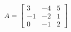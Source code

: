 \documentclass[preview]{standalone}
\begin{document}
\begin{align*}
A = \begin{bmatrix} 3 & -4 & 5 \\ -1 & -2 & 1 \\ 0 & -1 & 2 \end{bmatrix}
\end{align*}
\end{document}

